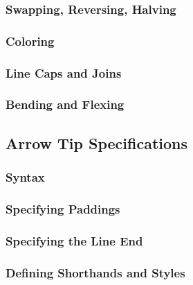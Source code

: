 \subsubsection{Swapping, Reversing, Halving}

\subsubsection{Coloring}

\subsubsection{Line Caps and Joins}
\label{section-arrow-key-caps}

\subsubsection{Bending and Flexing}


\subsection{Arrow Tip Specifications}
\label{section-arrow-spec}

\subsubsection{Syntax}

\subsubsection{Specifying Paddings}

\subsubsection{Specifying the Line End}

\subsubsection{Defining Shorthands and Styles}

